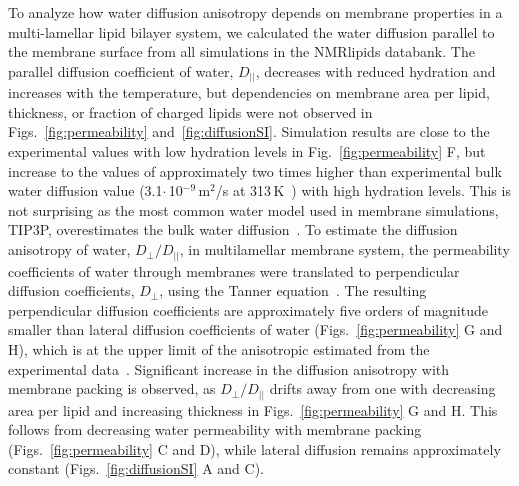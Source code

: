 \documentclass[fleqn,10pt]{wlscirep}
\begin{document}
To analyze how water diffusion anisotropy depends on membrane properties in a multi-lamellar lipid bilayer system, we calculated the water diffusion parallel to the membrane surface from all simulations in the NMRlipids databank. The parallel diffusion coefficient of water, $D_{||}$, decreases with reduced hydration and increases with the temperature, but dependencies on membrane area per lipid, thickness, or fraction of charged lipids were not observed in Figs.~\ref{fig:permeability} and~\ref{fig:diffusionSI}.
Simulation results are close to the experimental values with low hydration levels in Fig.~\ref{fig:permeability} F, but increase to the values of approximately two times higher than experimental bulk water diffusion value (3.1$\cdot$\,10$^{-9}$\,m$^2$/s at 313\,K~\cite{khakimov08}) with high hydration levels. This is not surprising as the most common water model used in membrane simulations, TIP3P, overestimates the bulk water diffusion~\cite{pathirannahalage21}. To estimate the diffusion anisotropy of water, $D_\mathrm{\perp}/D_{||}$, in multilamellar membrane system, the permeability coefficients of water through membranes were translated to perpendicular diffusion coefficients, $D_\mathrm{\perp}$, using the Tanner equation~\cite{tanner78,wasterby02}. The resulting perpendicular diffusion coefficients are approximately five orders of magnitude smaller than lateral diffusion coefficients of water (Figs.~\ref{fig:permeability} G and H), which is at the upper limit of the anisotropic estimated from the experimental data~\cite{nitsche19}. 
Significant increase in the diffusion anisotropy with membrane packing is observed, as $D_\mathrm{\perp}/D_{||}$ drifts away from one with decreasing area per lipid and increasing thickness in Figs.~\ref{fig:permeability} G and H. This follows from decreasing water permeability with membrane packing (Figs.~\ref{fig:permeability} C and D), while lateral diffusion remains approximately constant (Figs.~\ref{fig:diffusionSI} A and C). 
\end{document}
